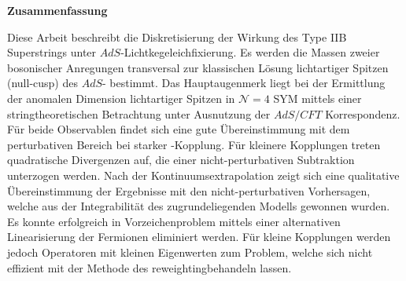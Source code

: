 %
\begin{center}
{\sffamily \bfseries\Large Zusammenfassung}\\
\end{center}%
\vspace{1cm}
%
Diese Arbeit beschreibt die Diskretisierung der Wirkung des Type IIB  Superstrings unter $AdS$-Lichtkegeleichfixierung. Es werden die Massen zweier bosonischer Anregungen transversal zur klassischen Lösung lichtartiger Spitzen (null-cusp) des $AdS$- bestimmt. Das Hauptaugenmerk liegt bei der Ermittlung der anomalen Dimension lichtartiger Spitzen in $\mathcal{N}=4$ SYM mittels einer stringtheoretischen Betrachtung unter Ausnutzung der \linebreak $AdS/CFT$ Korrespondenz. Für beide Observablen findet sich eine gute Übereinstimmung mit dem perturbativen Bereich bei starker -Kopplung. Für kleinere Kopplungen treten quadratische Divergenzen auf, die einer nicht-perturbativen Subtraktion unterzogen werden. Nach der Kontinuumsextrapolation zeigt sich eine qualitative Übereinstimmung der Ergebnisse mit den nicht-perturbativen Vorhersagen, welche aus der Integrabilität des zugrundeliegenden Modells gewonnen wurden. Es konnte erfolgreich in Vorzeichenproblem mittels einer alternativen Linearisierung der Fermionen eliminiert werden. Für kleine Kopplungen werden jedoch Operatoren mit kleinen Eigenwerten zum Problem, welche sich nicht effizient mit der Methode des \glqq reweighting\grqq{ }behandeln lassen.
